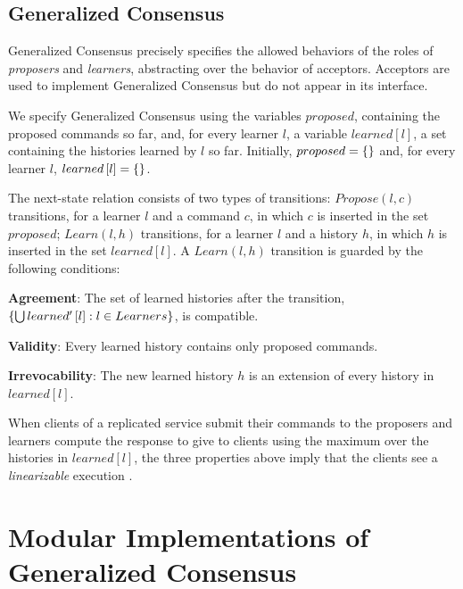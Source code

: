 \subsection{Generalized Consensus}

Generalized Consensus precisely specifies the allowed behaviors of the roles of \emph{proposers}
and \emph{learners}, abstracting over the behavior of acceptors. Acceptors are used to implement Generalized Consensus but do not appear in its interface.

We specify Generalized Consensus using the variables $proposed$, containing the proposed commands so far,
and, for every learner $l$,  a variable $learned\left[ l \right]$, a set containing the histories learned by $l$ so far. Initially, $proposed = \left\{\right\}$ and, for every learner $l$,
$learned\left[ l \right] = \left\{\right\}$. 

The next-state relation consists of two types of transitions:
$Propose\left( l, c
\right)$ transitions, for a learner $l$ and a command $c$, in which
$c$ is inserted in the set $proposed$; $Learn\left( l,h \right)$
transitions, for a learner $l$ and a history $h$, in
which $h$ is inserted in the set $learned\left[ l \right]$. 
A $Learn\left( l, h \right)$ transition is guarded by the following conditions:
\begin{compactitem}
    \item[\textbf{Agreement}:] The set of learned histories after the transition, $\left\{\bigcup learned'\left[ l
      \right] : l \in Learners\right\}$, is compatible.
    \item[\textbf{Validity}:] Every learned history contains only
        proposed commands.  
    \item[\textbf{Irrevocability}:] The new learned history
      $h$ is an extension of every history in $learned\left[ l \right]$. 
\end{compactitem}


When clients of a replicated service submit their commands to the proposers and learners compute the response to give to clients using the maximum over the histories in $learned\left[ l \right]$, the three properties above imply that the clients see a \emph{linearizable} execution
\cite{HerlihyWing90LinearizabilityCorrectnessConditionConcurrentObjects}.

\section{Modular Implementations of Generalized Consensus}

